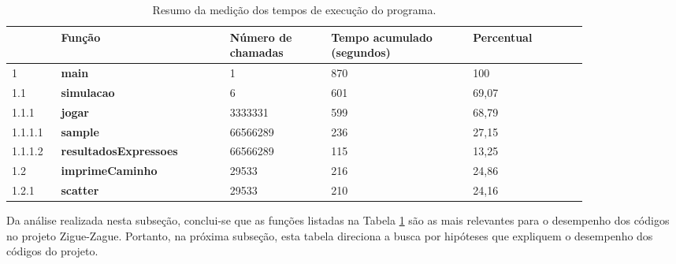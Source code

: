 \documentclass[12pt]{article}
\begin{document}
\begin{table}[H]
	\centering
	\caption{Resumo da medição dos tempos de execução do programa.}
	\label{tab}
	\begin{tabular}{|m{0.07\linewidth}|m{0.25\linewidth}|m{0.15\linewidth}|m{0.21\linewidth}|m{0.17	\linewidth}|}
		\hline
		 & \textbf{Função} & \textbf{Número de chamadas} & \textbf{Tempo acumulado (segundos)} & \textbf{Percentual}\\
		\hline \hline
		1 & \textbf{main} & 1	& 870 & 100 \\
		\hline
		1.1 & \textbf{simulacao} & 6	& 601  & 69,07 \\
		\hline
		1.1.1& \textbf{jogar} & 3333331 & 599 & 68,79 \\
		\hline
		1.1.1.1 & \textbf{sample} & 66566289 & 236 & 27,15 \\
		\hline
		1.1.1.2 & \textbf{resultadosExpressoes} & 66566289 & 115 & 13,25 \\
		\hline
		1.2 & \textbf{imprimeCaminho} & 29533   & 216 & 24,86 \\
		\hline
		1.2.1 & \textbf{scatter} & 29533 & 210 & 24,16 \\
		\hline
	\end{tabular}
\end{table}

Da análise realizada nesta subseção, conclui-se que as funções listadas na Tabela \ref{tab} são as mais relevantes para o desempenho dos códigos no projeto Zigue-Zague. Portanto, na próxima subseção, esta tabela direciona a busca por hipóteses que expliquem o desempenho dos códigos do projeto.





\end{document}
